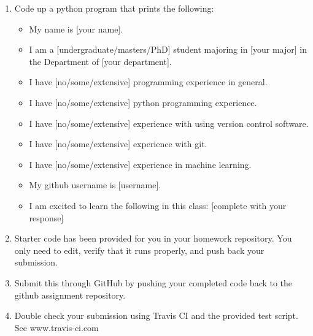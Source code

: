 \documentclass[11pt]{amsart}
\begin{document}
\begin{enumerate}
\item Code up a python program that prints the following:

\begin{itemize}
\item My name is [your name].
\item I am a [undergraduate/masters/PhD] student majoring in [your major] in the Department of [your department].
\item I have [no/some/extensive] programming experience in general.
\item I have [no/some/extensive] python programming experience.
\item I have [no/some/extensive] experience with using version control software. 
\item I have [no/some/extensive] experience with git.
\item I have [no/some/extensive] experience in machine learning.
\item My github username is [username].
\item I am excited to learn the following in this class: [complete with your response]
\end{itemize}
\item Starter code has been provided for you in your homework repository.  You only need to edit, verify that it runs properly, and push back your submission. 
\item Submit this through GitHub by pushing your completed code back to the github assignment repository. 
\item Double check your submission using Travis CI and the provided test script. See www.travis-ci.com
\end{enumerate}
\end{document}

